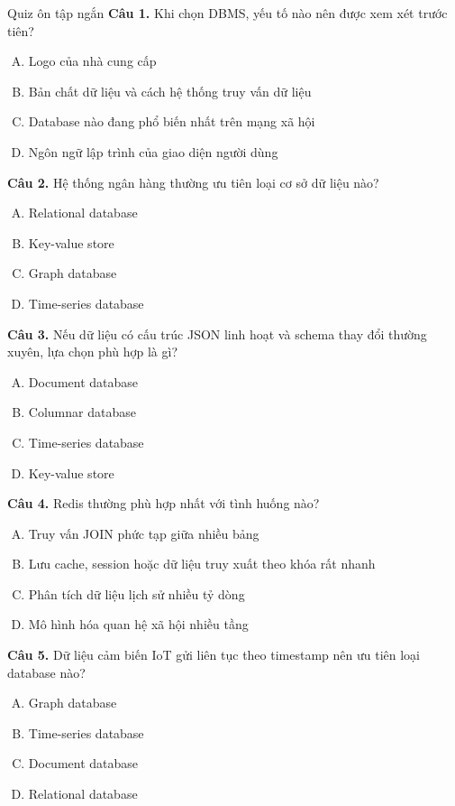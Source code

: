 \documentclass[aspectratio=169,11pt]{beamer}
\begin{document}
\begin{frame}[allowframebreaks]{Quiz ôn tập ngắn}
\small
\textbf{Câu 1.} Khi chọn DBMS, yếu tố nào nên được xem xét trước tiên?
\begin{enumerate}[A.]
  \item Logo của nhà cung cấp
  \item Bản chất dữ liệu và cách hệ thống truy vấn dữ liệu
  \item Database nào đang phổ biến nhất trên mạng xã hội
  \item Ngôn ngữ lập trình của giao diện người dùng
\end{enumerate}

\textbf{Câu 2.} Hệ thống ngân hàng thường ưu tiên loại cơ sở dữ liệu nào?
\begin{enumerate}[A.]
  \item Relational database
  \item Key-value store
  \item Graph database
  \item Time-series database
\end{enumerate}

\textbf{Câu 3.} Nếu dữ liệu có cấu trúc JSON linh hoạt và schema thay đổi thường xuyên, lựa chọn phù hợp là gì?
\begin{enumerate}[A.]
  \item Document database
  \item Columnar database
  \item Time-series database
  \item Key-value store
\end{enumerate}

\textbf{Câu 4.} Redis thường phù hợp nhất với tình huống nào?
\begin{enumerate}[A.]
  \item Truy vấn JOIN phức tạp giữa nhiều bảng
  \item Lưu cache, session hoặc dữ liệu truy xuất theo khóa rất nhanh
  \item Phân tích dữ liệu lịch sử nhiều tỷ dòng
  \item Mô hình hóa quan hệ xã hội nhiều tầng
\end{enumerate}

\textbf{Câu 5.} Dữ liệu cảm biến IoT gửi liên tục theo timestamp nên ưu tiên loại database nào?
\begin{enumerate}[A.]
  \item Graph database
  \item Time-series database
  \item Document database
  \item Relational database
\end{enumerate}


\end{frame}
\end{document}
